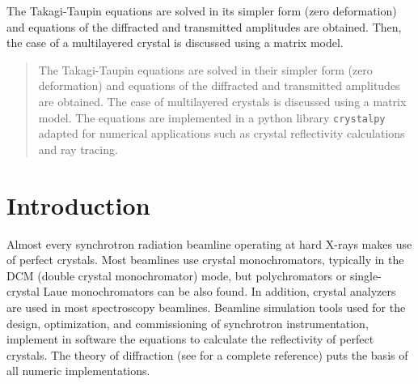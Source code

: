 \documentclass[preprint]{iucr}              %
\begin{document}
\maketitle                        %

\begin{synopsis}
The Takagi-Taupin equations are solved in its simpler form (zero deformation) and equations of the diffracted and transmitted amplitudes are obtained. Then, the case of a multilayered crystal is discussed using a matrix model. 
\end{synopsis}


\begin{abstract}

The Takagi-Taupin equations are solved in their simpler form (zero deformation) and equations of the diffracted and transmitted amplitudes are obtained. The case of multilayered crystals is discussed using a matrix model. The equations are implemented in a python library \texttt{crystalpy} adapted for numerical applications such as crystal reflectivity calculations and ray tracing.

\end{abstract}



\section{Introduction}
\label{sec:Intro}

Almost every synchrotron radiation beamline operating at hard X-rays makes use of perfect crystals.  
Most beamlines use crystal monochromators, typically in the DCM (double crystal monochromator) mode, but polychromators or single-crystal Laue monochromators can be also found. In addition, crystal analyzers are used in most spectroscopy beamlines. 
Beamline simulation tools used for the design, optimization, and commissioning of synchrotron instrumentation, implement in software the equations to calculate the reflectivity of perfect crystals. The theory of diffraction (see \cite{authierbook} for a complete reference) puts the basis of all numeric implementations. 
\end{document}
